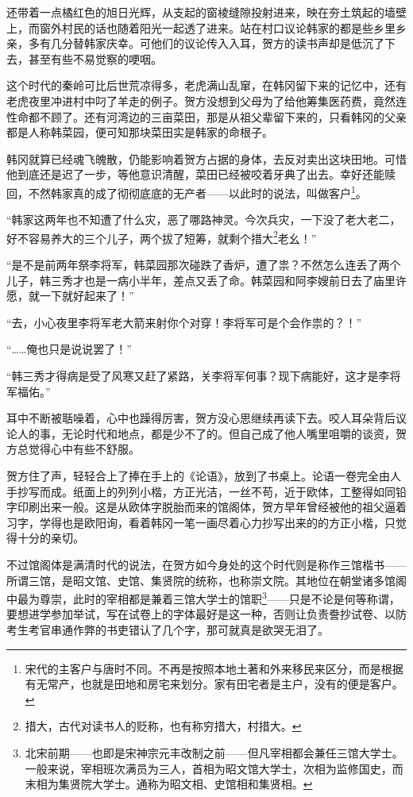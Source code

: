 还带着一点橘红色的旭日光辉，从支起的窗棱缝隙投射进来，映在夯土筑起的墙壁上，而窗外村民的话也随着阳光一起透了进来。站在村口议论韩家的都是些乡里乡亲，多有几分替韩家庆幸。可他们的议论传入入耳，贺方的读书声却是低沉了下去，甚至有些不易觉察的哽咽。

这个时代的秦岭可比后世荒凉得多，老虎满山乱窜，在韩冈留下来的记忆中，还有老虎夜里冲进村中叼了羊走的例子。贺方没想到父母为了给他筹集医药费，竟然连性命都不顾了。还有河湾边的三亩菜田，那是从祖父辈留下来的，只看韩冈的父亲都是人称韩菜园，便可知那块菜田实是韩家的命根子。

韩冈就算已经魂飞魄散，仍能影响着贺方占据的身体，去反对卖出这块田地。可惜他到底还是迟了一步，等他意识清醒，菜田已经被咬着牙典了出去。幸好还能赎回，不然韩家真的成了彻彻底底的无产者——以此时的说法，叫做客户\footnote{宋代的主客户与唐时不同。不再是按照本地土著和外来移民来区分，而是根据有无常产，也就是田地和房宅来划分。家有田宅者是主户，没有的便是客户。}。

“韩家这两年也不知遭了什么灾，恶了哪路神灵。今次兵灾，一下没了老大老二，好不容易养大的三个儿子，两个拔了短筹，就剩个措大\footnote{措大，古代对读书人的贬称，也有称穷措大，村措大。}老幺！”

“是不是前两年祭李将军，韩菜园那次碰跌了香炉，遭了祟？不然怎么连丢了两个儿子，韩三秀才也是一病小半年，差点又丢了命。韩菜园和阿李嫂前日去了庙里许愿，就一下就好起来了！”

“去，小心夜里李将军老大箭来射你个对穿！李将军可是个会作祟的？！”

“……俺也只是说说罢了！”

“韩三秀才得病是受了风寒又赶了紧路，关李将军何事？现下病能好，这才是李将军福佑。”

耳中不断被聒噪着，心中也躁得厉害，贺方没心思继续再读下去。咬人耳朵背后议论人的事，无论时代和地点，都是少不了的。但自己成了他人嘴里咀嚼的谈资，贺方总觉得心中有些不舒服。

贺方住了声，轻轻合上了捧在手上的《论语》，放到了书桌上。论语一卷完全由人手抄写而成。纸面上的列列小楷，方正光洁，一丝不苟，近于欧体，工整得如同铅字印刷出来一般。这是从欧体字脱胎而来的馆阁体，贺方早年曾经被他的祖父逼着习字，学得也是欧阳询，看着韩冈一笔一画尽着心力抄写出来的的方正小楷，只觉得十分的亲切。

不过馆阁体是满清时代的说法，在贺方如今身处的这个时代则是称作三馆楷书——所谓三馆，是昭文馆、史馆、集贤院的统称，也称崇文院。其地位在朝堂诸多馆阁中最为尊崇，此时的宰相都是兼着三馆大学士的馆职\footnote{北宋前期——也即是宋神宗元丰改制之前——但凡宰相都会兼任三馆大学士。一般来说，宰相班次满员为三人，首相为昭文馆大学士，次相为监修国史，而末相为集贤院大学士。通称为昭文相、史馆相和集贤相。}——只是不论是何等称谓，要想进学参加举试，写在试卷上的字体最好是这一种，否则让负责誊抄试卷、以防考生考官串通作弊的书吏错认了几个字，那可就真是欲哭无泪了。


